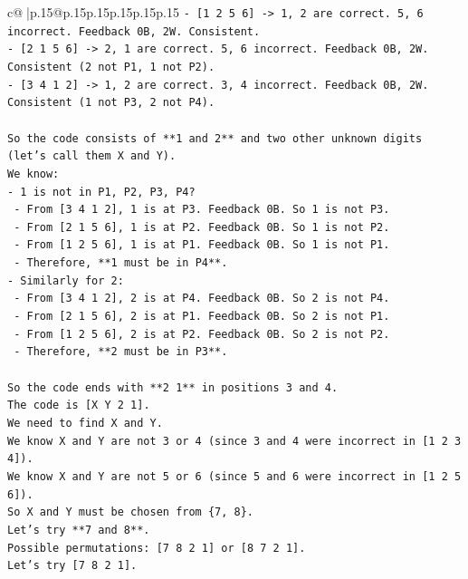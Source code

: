 \documentclass{article}
\begin{document}
{\begin{supertabular}{c@{$\;$}|p{.15\linewidth}@{}p{.15\linewidth}p{.15\linewidth}p{.15\linewidth}p{.15\linewidth}p{.15\linewidth}}
{{{\texttt{{-} {[}1 2 5 6{]} {-}> 1, 2 are correct. 5, 6 incorrect. Feedback 0B, 2W. Consistent.} \\
\texttt{{-} {[}2 1 5 6{]} {-}> 2, 1 are correct. 5, 6 incorrect. Feedback 0B, 2W. Consistent (2 not P1, 1 not P2).} \\
\texttt{{-} {[}3 4 1 2{]} {-}> 1, 2 are correct. 3, 4 incorrect. Feedback 0B, 2W. Consistent (1 not P3, 2 not P4).} \\
\\ 
\texttt{So the code consists of **1 and 2** and two other unknown digits (let's call them X and Y).} \\
\texttt{We know:} \\
\texttt{{-} 1 is not in P1, P2, P3, P4?} \\
\texttt{  {-} From {[}3 4 1 2{]}, 1 is at P3. Feedback 0B. So 1 is not P3.} \\
\texttt{  {-} From {[}2 1 5 6{]}, 1 is at P2. Feedback 0B. So 1 is not P2.} \\
\texttt{  {-} From {[}1 2 5 6{]}, 1 is at P1. Feedback 0B. So 1 is not P1.} \\
\texttt{  {-} Therefore, **1 must be in P4**.} \\
\texttt{{-} Similarly for 2:} \\
\texttt{  {-} From {[}3 4 1 2{]}, 2 is at P4. Feedback 0B. So 2 is not P4.} \\
\texttt{  {-} From {[}2 1 5 6{]}, 2 is at P1. Feedback 0B. So 2 is not P1.} \\
\texttt{  {-} From {[}1 2 5 6{]}, 2 is at P2. Feedback 0B. So 2 is not P2.} \\
\texttt{  {-} Therefore, **2 must be in P3**.} \\
\\ 
\texttt{So the code ends with **2 1** in positions 3 and 4.} \\
\texttt{The code is {[}X Y 2 1{]}.} \\
\texttt{We need to find X and Y.} \\
\texttt{We know X and Y are not 3 or 4 (since 3 and 4 were incorrect in {[}1 2 3 4{]}).} \\
\texttt{We know X and Y are not 5 or 6 (since 5 and 6 were incorrect in {[}1 2 5 6{]}).} \\
\texttt{So X and Y must be chosen from \{7, 8\}.} \\
\texttt{Let's try **7 and 8**.} \\
\texttt{Possible permutations: {[}7 8 2 1{]} or {[}8 7 2 1{]}.} \\
\texttt{Let's try {[}7 8 2 1{]}.} \\
}}}
\end{supertabular}}
\end{document}
